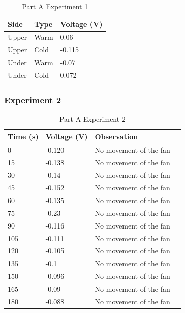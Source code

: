 \documentclass[a4paper, 12pt, english]{article}
\begin{document}
\begin{table}[H]
	\centering
	\caption{Part A Experiment 1}
	\label{tab:partA1}
	\begin{tabular}{@{}lll@{}}
		\toprule
		\textbf{Side} & \textbf{Type} & \textbf{Voltage (V)} \\ \midrule
		Upper         & Warm          & 0.06                 \\
		Upper         & Cold          & -0.115               \\
		Under         & Warm          & -0.07                \\
		Under         & Cold          & 0.072                \\ \bottomrule
	\end{tabular}
\end{table}

\subsubsection{Experiment 2}
\begin{table}[H]
	\centering
	\caption{Part A Experiment 2}
	\label{tab:partA2}
	\begin{tabular}{@{}llll@{}}
		\toprule
		\textbf{Time (s)} & \textbf{Voltage (V)} & \textbf{Observation}   \\ \midrule
		0                 & -0.120                    & No movement of the fan \\
		15                & -0.138               & No movement of the fan \\
		30                & -0.14                & No movement of the fan \\
		45                & -0.152               & No movement of the fan \\
		60                & -0.135               & No movement of the fan \\
		75                & -0.23                & No movement of the fan \\
		90                & -0.116               & No movement of the fan \\
		105               & -0.111               & No movement of the fan \\
		120               & -0.105               & No movement of the fan \\
		135               & -0.1                 & No movement of the fan \\
		150               & -0.096               & No movement of the fan \\
		165               & -0.09                & No movement of the fan \\
		180               & -0.088               & No movement of the fan \\ \bottomrule
	\end{tabular}
\end{table}
\end{document}
